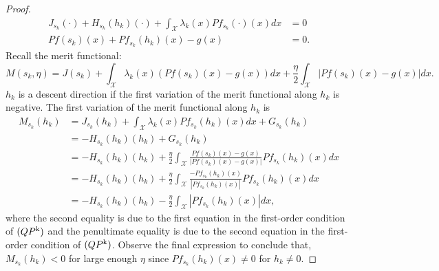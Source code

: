 \documentclass[12pt,leqno]{amsart}
\begin{document}
\begin{proof}
    \begin{align*}
        J_{s_k}(\cdot)+H_{s_k}(h_k)(\cdot)+\int_{\mathcal{X}}\lambda_k(x)Pf_{s_k}(\cdot)(x)dx&=0\\
        Pf(s_k)(x)+Pf_{s_k}(h_k)(x)-g(x)&=0.
    \end{align*}
    Recall the merit functional:
    \[
    M(s_k,\eta)=J(s_k)+\int_{\mathcal{X}}\lambda_k(x)(Pf(s_k)(x)-g(x))dx+\frac{\eta}{2}\int_{\mathcal{X}}|Pf(s_k)(x)-g(x)|dx.
    \]
    $h_k$ is a descent direction if the first variation of the merit functional along $h_k$ is negative. The first variation of the merit functional along $h_k$ is
    \begin{align*}
        M_{s_k}(h_k)&=J_{s_k}(h_k)+\int_{\mathcal{X}}\lambda_k(x)Pf_{s_k}(h_k)(x)dx+ G_{s_k}(h_k)\\
        &=-H_{s_k}(h_k)(h_k)+G_{s_k}(h_k)\\
        &=-H_{s_k}(h_k)(h_k)+\frac{\eta}{2}\int_{\mathcal{X}} \frac{Pf(s_k)(x)-g(x)}{|Pf(s_k)(x)-g(x)|}Pf_{s_k}(h_k)(x) dx\\
        &=-H_{s_k}(h_k)(h_k)+\frac{\eta}{2}\int_{\mathcal{X}} \frac{-Pf_{s_k}(h_k)(x)}{|Pf_{s_k}(h_k)(x)|}Pf_{s_k}(h_k)(x) dx\\
        &=-H_{s_k}(h_k)(h_k)-\frac{\eta}{2}\int_{\mathcal{X}}\left|Pf_{s_k}(h_k)(x)\right|dx,
    \end{align*}
    where the second equality is due to the first equation in the first-order condition of $(QP\textsuperscript{k})$ and the penultimate equality is due to the second equation in the first-order condition of $(QP\textsuperscript{k})$. Observe the final expression to conclude that, $ M_{s_k}(h_k)<0$ for large enough $\eta$ since $Pf_{s_k}(h_k)(x)\neq 0$ for $h_k\neq 0$. 
\end{proof}    
\end{document}
